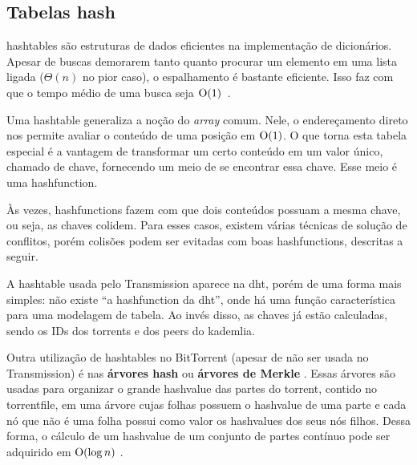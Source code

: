 
\subsection*{Tabelas hash}

\Glspl{hashtable} são estruturas de dados eficientes na implementação de dicionários.
Apesar de buscas demorarem tanto quanto procurar um elemento em uma lista ligada
($\Theta(n)$ no pior caso), o espalhamento é bastante eficiente. Isso faz com que o
tempo médio de uma busca seja $\textup{O}(1)$~\cite{book:clrs}.

Uma \gls*{hashtable} generaliza a noção do \emph{array} comum. Nele, o endereçamento
direto nos permite avaliar o conteúdo de uma posição em $\textup{O}(1)$. O que torna esta
tabela especial é a vantagem de transformar um certo conteúdo em um valor único,
chamado de chave, fornecendo um meio de se encontrar essa chave. Esse meio é uma
\gls{hashfunction}.

Às vezes, \glspl*{hashfunction} fazem com que dois conteúdos possuam a mesma chave, ou
seja, as chaves colidem. Para esses casos, existem várias técnicas de solução de
conflitos, porém colisões podem ser evitadas com boas \glspl*{hashfunction}, descritas a
seguir.

A \gls*{hashtable} usada pelo Transmission aparece na \gls*{dht}, porém de uma forma
mais simples: não existe ``a \gls*{hashfunction} da \gls*{dht}'', onde há uma função
característica para uma modelagem de tabela. Ao invés disso, as chaves já estão
calculadas, sendo os IDs dos \glspl*{torrent} e dos \glspl*{peer} do \gls*{kademlia}.

Outra utilização de \glspl*{hashtable} no BitTorrent (apesar de não ser usada no
Transmission) é nas \textbf{árvores hash} ou \textbf{árvores de Merkle}
\cite{site:merkletree}. Essas árvores são usadas para organizar o grande
\gls*{hashvalue} das partes do \gls*{torrent}, contido no \gls*{torrentfile}, em uma
árvore cujas folhas possuem o \gls*{hashvalue} de uma parte e cada nó que não é uma
folha possui como valor os \glspl*{hashvalue} dos seus nós filhos. Dessa forma, o
cálculo de um \gls*{hashvalue} de um conjunto de partes contínuo pode ser adquirido em
$\textup{O}(\log n)$ \cite{artigo:merkletree-cripto}.
